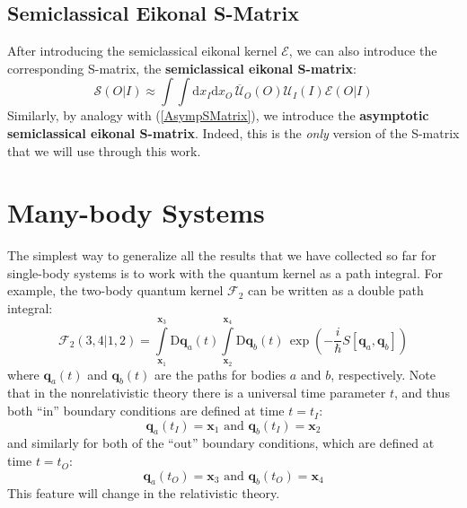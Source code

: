 \subsection{Semiclassical Eikonal S-Matrix}
After introducing the semiclassical eikonal kernel $\mathcal{E}$, we can also introduce the corresponding S-matrix, the \textbf{semiclassical eikonal S-matrix}:
\begin{equation}
	\mathcal{S}(O|I) \approx \int \int \mathrm{d} x_{I} \mathrm{d} x_{O} \, \overline{\mathcal{U}}_{O}(O) \mathcal{U}_{I}(I) \mathcal{E}(O|I)
\end{equation}
Similarly, by analogy with (\ref{AsympSMatrix}), we introduce the \textbf{asymptotic semiclassical eikonal S-matrix}. Indeed, this is the \textit{only} version of the S-matrix that we will use through this work.
\section{Many-body Systems}
The simplest way to generalize all the results that we have collected so far for single-body systems is to work with the quantum kernel as a path integral. For example, the two-body quantum kernel $\mathcal{F}_{2}$ can be written as a double path integral:
\begin{equation}
	\mathcal{F}_{2}(3,4|1,2) = \int\limits_{\mathbf{x}_{1}}^{\mathbf{x}_{3}} \mathrm{D}\mathbf{q}_{a}(t) \int\limits_{\mathbf{x}_{2}}^{\mathbf{x}_{4}} \mathrm{D}\mathbf{q}_{b}(t) \, \exp{\left( - \frac{i}{\hbar} S[ \mathbf{q}_{a}, \mathbf{q}_{b} ] \right)}
\end{equation}
where $\mathbf{q}_{a}(t)$ and $\mathbf{q}_{b}(t)$ are the paths for bodies $a$ and $b$, respectively. Note that in the nonrelativistic theory there is a universal time parameter $t$, and thus both ``in'' boundary conditions are defined at time $t = t_{I}$:
\begin{equation}
	\mathbf{q}_{a}(t_{I}) = \mathbf{x}_{1} \text{ and } \mathbf{q}_{b}(t_{I}) = \mathbf{x}_{2}
\end{equation}
and similarly for both of the ``out'' boundary conditions, which are defined at time $t = t_{O}$:
\begin{equation}
	\mathbf{q}_{a}(t_{O}) = \mathbf{x}_{3} \text{ and } \mathbf{q}_{b}(t_{O}) = \mathbf{x}_{4}
\end{equation}
This feature will change in the relativistic theory.